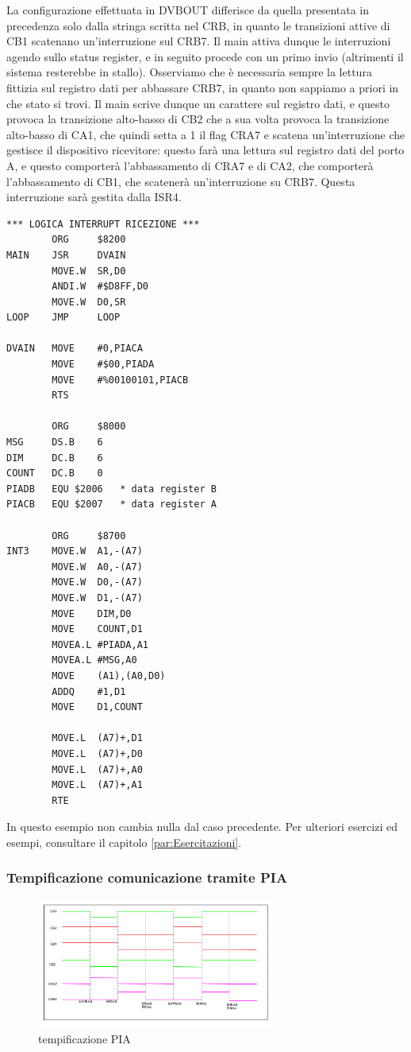La configurazione effettuata in DVBOUT differisce da quella presentata in precedenza solo dalla stringa scritta nel CRB, in quanto le transizioni attive di CB1 scatenano un'interruzione sul CRB7. Il main attiva dunque le interruzioni agendo sullo status register, e in seguito procede con un primo invio (altrimenti il sistema resterebbe in stallo). Osserviamo che è necessaria sempre la lettura fittizia sul registro dati per abbassare CRB7, in quanto non sappiamo a priori in che stato si trovi. Il main scrive dunque un carattere sul registro dati, e questo provoca la transizione alto-basso di CB2 che a sua volta provoca la transizione alto-basso di CA1, che quindi setta a 1 il flag CRA7 e scatena un'interruzione che gestisce il dispositivo ricevitore: questo farà una lettura sul registro dati del porto A, e questo comporterà l'abbassamento di CRA7 e di CA2, che comporterà l'abbassamento di CB1, che scatenerà un'interruzione su CRB7. Questa interruzione sarà gestita dalla ISR4. 

\begin{lstlisting}
*** LOGICA INTERRUPT RICEZIONE ***
        ORG     $8200
MAIN    JSR     DVAIN 
        MOVE.W  SR,D0 
        ANDI.W  #$D8FF,D0 
        MOVE.W  D0,SR 
LOOP    JMP     LOOP 

DVAIN   MOVE    #0,PIACA
        MOVE    #$00,PIADA
        MOVE    #%00100101,PIACB
        RTS

        ORG     $8000
MSG     DS.B    6
DIM     DC.B    6
COUNT   DC.B    0
PIADB   EQU $2006   * data register B
PIACB   EQU $2007   * data register A

        ORG     $8700
INT3    MOVE.W  A1,-(A7)
        MOVE.W  A0,-(A7)
        MOVE.W  D0,-(A7)
        MOVE.W  D1,-(A7)
        MOVE    DIM,D0 
        MOVE    COUNT,D1 
        MOVEA.L #PIADA,A1 
        MOVEA.L #MSG,A0 
        MOVE    (A1),(A0,D0)
        ADDQ    #1,D1 
        MOVE    D1,COUNT

        MOVE.L  (A7)+,D1 
        MOVE.L  (A7)+,D0 
        MOVE.L  (A7)+,A0
        MOVE.L  (A7)+,A1 
        RTE
\end{lstlisting}

In questo esempio non cambia nulla dal caso precedente. 
Per ulteriori esercizi ed esempi, consultare il capitolo \ref{par:Esercitazioni}.

\subsubsection{Tempificazione comunicazione tramite PIA}
\begin{figure}[ht]
    \centering
    \includegraphics[width=0.7\textwidth]{img/PIA_temp.png}
    \caption{tempificazione PIA}
    \label{img:temp_PIA}
\end{figure}

